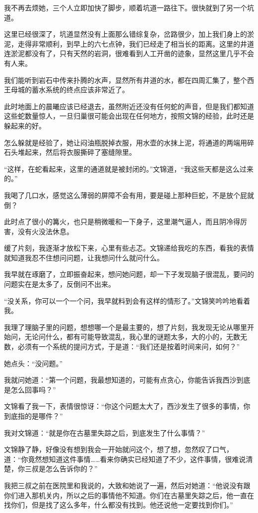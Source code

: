 我不再去烦她，三个人立即加快了脚步，顺着坑道一路往下。很快就到了另一个坑道。

这里已经很深了，坑道显然没有上面那么错综复杂，岔路很少，加上我们身上的淤泥，走得非常顺利，到早上的六七点钟，我们已经走了相当长的距离。这里的井道连淤泥都没有了，只有天然的岩洞，很难看到人工开凿的迹象，显然这里几乎不会有人来。

我们能听到岩石中传来扑腾的水声，显然所有井道的水，都在四周汇集了，整个西王母城的蓄水系统的终点应该非常近了。

此时地面上的晨曦应该已经退去，虽然附近还没有任何蛇的声音，但是我们都知道这些蛇数量惊人，一旦归巢很可能会出现在任何地方，按照文锦的经验，此时还是躲起来的好。

怎么躲就是经验了，她让闷油瓶脱掉衣服，用水壶的水抹上泥，将通道的两端用碎石头堆起来，然后将衣服撕碎了塞缝隙里。

“这样，在蛇看起来，这里的通道就是被封闭的。”文锦道，“我这些天都是这么过来的。”

我喝了几口水，感觉这么薄弱的屏障不会有用，要是碰上那种巨蛇，不是放个屁就倒？

此时点了很小的篝火，也只是稍微暖和一下身子，这里潮气逼人，而且阴冷得厉害，没有火没法休息。

缓了片刻，我逐渐才放松下来，心里有些忐忑。文锦递给我吃的东西，看我的表情就知道我忍不住想问问题，让我想问什么就问什么。

我早就在琢磨了，立即振奋起来，想问她问题，却一下子发现脑子很混乱，要问的问题实在是太多了，反倒问不出来。

“没关系，你可以一个一个问，我早就料到会有这样的情形了。”文锦笑吟吟地看着我。

我理了理脑子里的问题，想想哪一个是最主要的，想了片刻，我发现无论从哪里开始问，无论问什么，都有可能导致混乱，我心里的谜题太多，大的小的，无数无数，必须有一个系统的提问方式，于是道：“我们还是按着时间来问，如何？”

她点头：“没问题。”

我就问她道：“第一个问题，我最想知道的，可能有点贪心，你能告诉我西沙到底是怎么回事吗？”

文锦看了我一下，表情很惊讶：“你这个问题太大了，西沙发生了很多的事情，你到底指的是哪件？”

我对文锦道：“就是你在古墓里失踪之后，到底发生了什么事情？”

文锦静了静，好像没有想到我会一开始就问这个，想了想，忽然叹了口气，道：“你竟然想知道这件事情……看来你确实已经知道了不少，这件事情，很难说清楚，你三叔是怎么告诉你的？”

我把三叔之前在医院里和我说的，大致和她说了一遍，然后对她道：“他说没有跟你们进入那机关内，所以之后的事情他不知道。你们在古墓里失踪之后，他一直在找你们，但是找了这么多年，什么都没有找到。他还说他一定要找到你们。”

